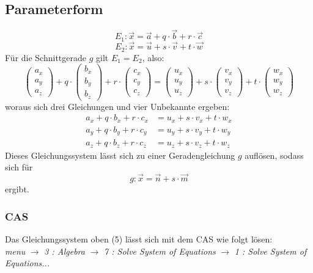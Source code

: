 \documentclass[a4paper,12pt]{article}
\begin{document}
\subsection{Parameterform}
$$E_1 : \vec{x} = \vec{a} + q \cdot \vec{b} + r \cdot \vec{c}$$
$$E_2 : \vec{x} = \vec{u} + s \cdot \vec{v} + t \cdot \vec{w}$$
Für die Schnittgerade $g$ gilt $E_1 = E_2$, also:
$$\begin{pmatrix}a_{x}\\a_{y}\\a_{z}\end{pmatrix} + q \cdot \begin{pmatrix}b_{x}\\b_{y}\\b_{z}\end{pmatrix} + r \cdot \begin{pmatrix}c_{x}\\c_{y}\\c_{z}\end{pmatrix} = \begin{pmatrix}u_{x}\\u_{y}\\u_{z}\end{pmatrix} + s \cdot \begin{pmatrix}v_{x}\\v_{y}\\v_{z}\end{pmatrix} + t \cdot \begin{pmatrix}w_{x}\\w_{y}\\w_{z}\end{pmatrix}$$
woraus sich drei Gleichungen und vier Unbekannte ergeben:
\begin{equation}
\begin{split}
a_x + q \cdot b_x + r \cdot c_x & = u_x + s \cdot v_x + t \cdot w_x\\
a_y + q \cdot b_y + r \cdot c_y & = u_y + s \cdot v_y + t \cdot w_y\\
a_z + q \cdot b_z + r \cdot c_z & = u_z + s \cdot v_z + t \cdot w_z
\end{split}
\end{equation}
Dieses Gleichungssystem lässt sich zu einer Geradengleichung $g$ auflösen, sodass sich für
$$g : \vec{x} = \vec{n} + s \cdot \vec{m}$$
ergibt.
\subsubsection{CAS}
Das Gleichungssystem oben (5) lässt sich mit dem CAS wie folgt lösen:\\
\textit{menu} $\rightarrow$ \textit{3 : Algebra} $\rightarrow$ \textit{7 : Solve System of Equations} $\rightarrow$ \textit{1 : Solve System of Equations...}
\end{document}
